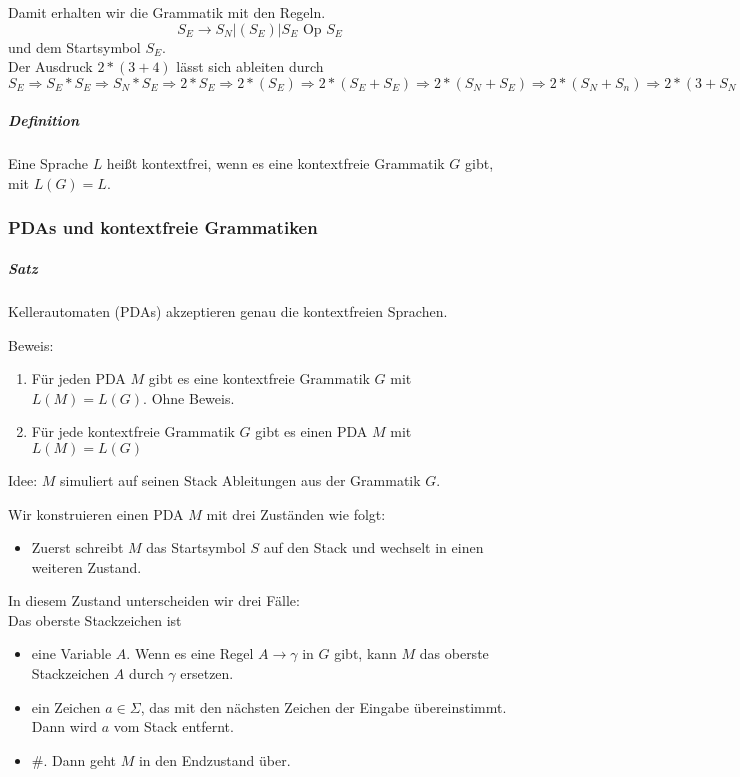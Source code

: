 \documentclass[a4paper]{scrartcl}
\begin{document}
Damit erhalten wir die Grammatik mit den Regeln.
\[ S_E \rightarrow S_N | (S_E) | S_E \text{ Op } S_E \]
und dem Startsymbol $S_E$.\\
Der Ausdruck $2 *(3+4)$ lässt sich ableiten durch\\
$S_E \Rightarrow S_E * S_E \Rightarrow S_N * S_E \Rightarrow 2 * S_E \Rightarrow 2*(S_E) \Rightarrow 2*(S_E + S_E) \Rightarrow 2*(S_N + S_E) \Rightarrow 2*(S_N + S_n) \Rightarrow 2*(3+ S_N) \Rightarrow 2*(3+4)$

\subparagraph{Definition} Eine Sprache $L$ heißt kontextfrei, wenn es eine kontextfreie Grammatik $G$ gibt, mit $L(G) = L$.

\subsubsection{PDAs und kontextfreie Grammatiken}
\subparagraph{Satz} Kellerautomaten (PDAs) akzeptieren genau die kontextfreien Sprachen.

Beweis:
\begin{enumerate}
\item Für jeden PDA $M$ gibt es eine kontextfreie Grammatik $G$ mit $L(M) = L(G)$. Ohne Beweis.
\item Für jede kontextfreie Grammatik $G$ gibt es einen PDA $M$ mit $L(M) = L(G)$
\end{enumerate}
Idee: $M$ simuliert auf seinen Stack Ableitungen aus der Grammatik $G$.

Wir konstruieren einen PDA $M$ mit drei Zuständen wie folgt:
\begin{itemize}
\item Zuerst schreibt $M$ das Startsymbol $S$ auf den Stack und wechselt in einen weiteren Zustand.
\end{itemize}
In diesem Zustand unterscheiden wir drei Fälle:\\
Das oberste Stackzeichen ist
\begin{itemize}
\item eine Variable $A$. Wenn es eine Regel $A \rightarrow \gamma$ in $G$ gibt, kann $M$ das oberste Stackzeichen $A$ durch $\gamma$ ersetzen.
\item ein Zeichen $a \in \Sigma $, das mit den nächsten Zeichen der Eingabe übereinstimmt. Dann wird $a$ vom Stack entfernt.
\item $\#$. Dann geht $M$ in den Endzustand über.
\end{itemize}

\end{document}
